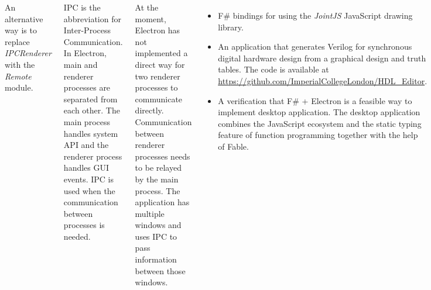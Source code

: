 \documentclass[12pt, a1paper, landscape, margin=10mm, innermargin=15mm, blockverticalspace=15mm, colspace=15mm, subcolspace=8mm]{tikzposter}
\newcommand*\circled[1]{\tikz[baseline=(char.base)]{
            \node[shape=circle,draw,inner sep=1pt] (char) {#1};}}
\begin{document}
\begin{columns}
{\begin{tikzpicture}[node distance=3cm]
\end{tikzpicture}

An alternative way is to replace \textit{IPCRenderer} with the \textit{Remote} module. \\


IPC is the abbreviation for Inter-Process Communication. In Electron, main and renderer processes are separated from each other. The main process handles system API and the renderer process handles GUI events. IPC is used when the communication between processes is needed. 

At the moment, Electron has not implemented a direct way for two renderer processes to communicate directly. Communication between renderer processes needs to be relayed by the main process. The application has multiple windows and uses IPC to pass information between those windows.

    }
    
    {
    \begin{itemize}
        \item F\# bindings for using the  \textit{JointJS} JavaScript drawing library.
        \item An application that generates Verilog for synchronous digital hardware design from a graphical design and truth tables. The code is available at \url{https://github.com/ImperialCollegeLondon/HDL_Editor}.
        \item A verification that F\# + Electron is a feasible way to implement desktop application. The desktop application combines the JavaScript ecosystem and the static typing feature of function programming together with the help of Fable.
    \end{itemize}
    }
    
    {
    I would like to thank Dr Clarke for supervising my project and providing advice on writing F\# code and using Fable for interop with JavaScript. I would also like to thank Zaid Ajaj and Alfonso Garcia-Caro, the authors of Fable, for answering my questions on GitHub regarding Fable version issues.
    }
    
\end{columns}
 
\end{document}
